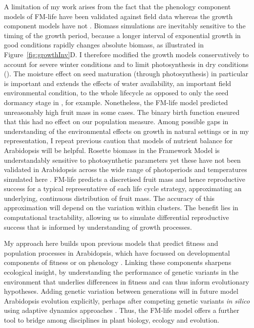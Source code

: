 A limitation of my work arises from the fact that the phenology component models
of FM-life have been validated against field data
\citep{wilczek_effects_2009,burghardt_modeling_2015} whereas the growth
component models have not
\citep{rasse_leaf_2006,christophe_model-based_2008}. Biomass simulations are
inevitably sensitive to the timing of the growth period, because a longer
interval of exponential growth in good conditions rapidly changes absolute
biomass, as illustrated in Figure~\ref{fig:growthInv}D. I therefore modified the
growth models conservatively to account for severe winter conditions and to
limit photosynthesis in dry conditions (). The moisture effect on
seed maturation (through photosynthesis) in particular is important and extends
the effects of water availability, an important field environmental condition,
to the whole lifecycle as opposed to only the seed dormancy stage in
\citep{burghardt_modeling_2015}, for example. Nonetheless, the FM-life model
predicted unreasonably high fruit mass in some cases. The binary birth function
ensured that this had no effect on our population measure. Among possible gaps
in understanding of the environmental effects on growth in natural settings or
in my representation, I repeat previous caution \citep{chew_multiscale_2014,
  chew_linking_2017} that models of nutrient balance for Arabidopsis will be
helpful. Rosette biomass in the Framework Model is understandably sensitive to
photosynthetic parameters \citep{chew_multiscale_2014} yet these have not been
validated in Arabidopsis across the wide range of photoperiods and temperatures
simulated here \citep{walker_temperature_2013}. FM-life predicts a discretised
fruit mass and hence reproductive success for a typical representative of each
life cycle strategy, approximating an underlying, continuous distribution of
fruit mass. The accuracy of this approximation will depend on the variation
within clusters. The benefit lies in computational tractability, allowing us to
simulate differential reproductive success that is informed by understanding of
growth processes.

My approach here builds upon previous models that predict fitness and population
processes in Arabidopsis, which have focussed on developmental components of
fitness or on phenology
\citep{prusinkiewicz_evolution_2007,satake_forecasting_2013,springthorpe_flowering_2015}. Linking
these components sharpens ecological insight, by understanding the performance
of genetic variants in the environment that underlies differences in fitness
\citep[see discussions in][]{burghardt_modeling_2015, doebeli_towards_2017} and
can thus inform evolutionary hypotheses. Adding genetic variation between
generations will in future model Arabidopsis evolution explicitly, perhaps after
competing genetic variants \emph{in silico} using adaptive dynamics approaches
\citep{brannstrom_hitchhikers_2013, weise_mechanistic_2015}.  Thus, the FM-life
model offers a further tool to bridge among disciplines in plant biology,
ecology and evolution.